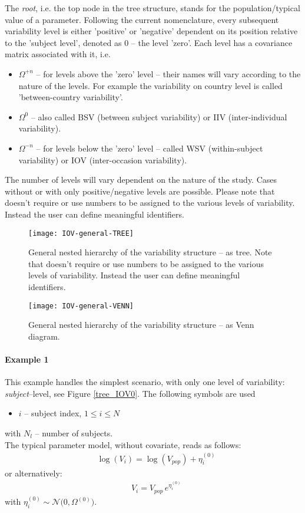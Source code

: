 The \textit{root}, i.e. the top node in the tree structure, stands for the population/typical value of a parameter. Following the current nomenclature, every subsequent variability level is either 'positive' or 'negative' dependent on its position relative to the 'subject level', denoted as 0 -- the level 'zero'. Each level has a covariance matrix associated with it, i.e. 
\begin{itemize}
\item 
$\Omega^{+n}$ -- for levels above the 'zero' level -- their names will vary according to the nature of the levels. For example the variability on country level is called 'between-country variability'.
\item 
$\Omega^0$ -- also called BSV (between subject variability) or IIV (inter-individual variability).
\item 
$\Omega^{-n}$ -- for levels below the 'zero' level -- called WSV (within-subject variability) or IOV (inter-occasion variability).
\end{itemize}
The number of levels will vary dependent on the nature of the study. Cases without or with only positive/negative levels are possible. Please note that \pharmml doesn't require or use numbers to be assigned to the various levels of variability. Instead the user can define meaningful identifiers.

\begin{figure}[htb!]
\centering
  \texttt{[image: IOV-general-TREE]}
 \caption{General nested hierarchy of the variability structure -- as tree. Note that \pharmml doesn't require or use numbers to be assigned to the various levels of variability. Instead the user can define meaningful identifiers.}
 \label{IOVgeneral_tree}
\end{figure}

\begin{figure}[htb!]
\centering
  \texttt{[image: IOV-general-VENN]}
 \caption{General nested hierarchy of the variability structure -- as Venn diagram.}
 \label{IOVgeneral_venn}
\end{figure}


\paragraph{Example 1}
This example handles the simplest scenario, with only one level of variability: \textit{subject}--level, see Figure \ref{tree_IOV0}. The following symbols are used
\begin{itemize}
\item
$i$ -- subject index, $1\le i \le N$
\end{itemize} 
with $N_l$ -- number of subjects.\\
The typical parameter model, without covariate, reads as follows:
\begin{align*}
& \log(V_i) = \log(V_{pop}) + \eta_i^{(0)}  
\end{align*} 
or alternatively:
\begin{align*}
& V_i = V_{pop} \,e^{\eta_i^{(0)}}  
\end{align*} 
with $\eta_i^{(0)} \sim \mathcal{N}\big(0,\Omega^{(0)}\big)$.


